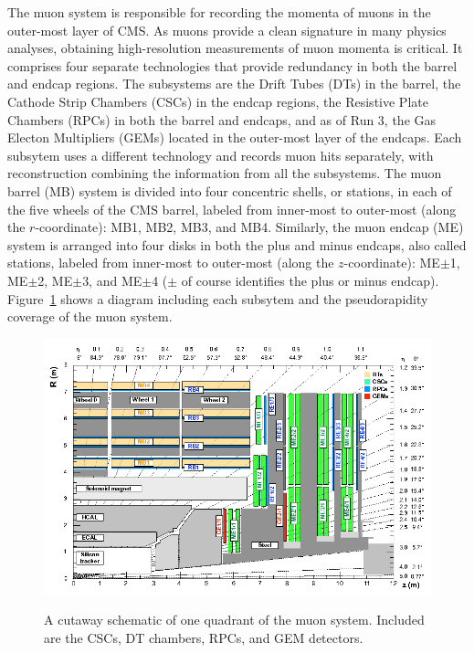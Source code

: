 The muon system \cite{MuonTDR} is responsible for recording the momenta of muons in the outer-most layer of CMS. As muons provide a clean signature in many physics analyses, obtaining high-resolution measurements of muon momenta is critical. It comprises four separate technologies that provide redundancy in both the barrel and endcap regions. The subsystems are the Drift Tubes (DTs) in the barrel, the Cathode Strip Chambers (CSCs) in the endcap regions, the Resistive Plate Chambers (RPCs) in both the barrel and endcaps, and as of Run 3, the Gas Electon Multipliers (GEMs) located in the outer-most layer of the endcaps. Each subsytem uses a different technology and records muon hits separately, with reconstruction combining the information from all the subsystems. The muon barrel (MB) system is divided into four concentric shells, or stations, in each of the five wheels of the CMS barrel, labeled from inner-most to outer-most (along the $r$-coordinate): MB1, MB2, MB3, and MB4. Similarly, the muon endcap (ME) system is arranged into four disks in both the plus and minus endcaps, also called stations, labeled from inner-most to outer-most (along the $z$-coordinate): ME$\pm$1, ME$\pm$2, ME$\pm$3, and ME$\pm$4 ($\pm$ of course identifies the plus or minus endcap). Figure~\ref{fig:MuonSystem} shows a diagram including each subsytem and the pseudorapidity coverage of the muon system.

\begin{figure}[H]
    \centering
    {\includegraphics[width=1\textwidth]{Images/CMS/MuonSystem.png}}
    \caption{A cutaway schematic of one quadrant of the muon system. Included are the CSCs, DT chambers, RPCs, and GEM detectors.}
    \label{fig:MuonSystem}
\end{figure}

